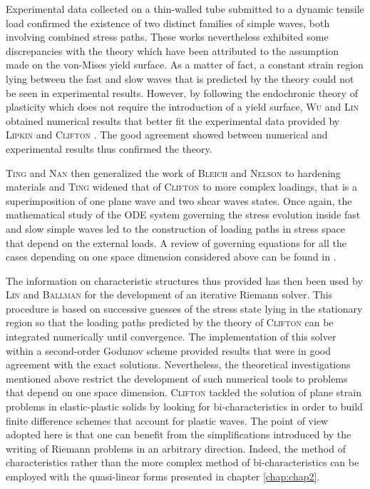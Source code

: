 Experimental data collected on a thin-walled tube submitted to a dynamic tensile load \cite{Clifton_exp,Clifton_exp2} confirmed the existence of two distinct families of  simple waves, both involving combined stress paths.
These works nevertheless exhibited some discrepancies with the theory which have been attributed to the assumption made on the von-Mises yield surface.
As a matter of fact, a constant strain region lying between the fast and slow waves that is predicted by the theory \cite{Clifton} could not be seen in experimental results.
However, by following the endochronic theory of plasticity \cite{Valanis} which does not require the introduction of a yield surface, \textsc{Wu} and \textsc{Lin} \cite{Wu_experimental} obtained numerical results that better fit the experimental data provided by \textsc{Lipkin} and \textsc{Clifton} \cite{Clifton_exp2}.
The good agreement showed between numerical and experimental results \cite{Wu_experimental} thus confirmed the theory.

\textsc{Ting} and \textsc{Nan} \cite{Ting68} then generalized the work of \textsc{Bleich} and \textsc{Nelson} to hardening materials and \textsc{Ting} \cite{Ting69} widened that of \textsc{Clifton} to more complex loadings, that is a superimposition of one plane wave and two shear waves states.
Once again, the mathematical study of the ODE system governing the stress evolution inside fast and slow simple waves led to the construction of loading paths in stress space that depend on the external loads. A review of governing equations for all the cases depending on one space dimension considered above can be found in \cite{Nowacki}.

The information on characteristic structures thus provided has then been used by \textsc{Lin} and \textsc{Ballman} \cite{Lin_et_Ballman} for the development of an iterative Riemann solver.
This procedure is based on successive guesses of the stress state lying in the stationary region so that the loading paths predicted by the theory of \textsc{Clifton} \cite{Clifton} can be integrated numerically until convergence.
The implementation of this solver within a second-order Godunov scheme provided results that were in good agreement with the exact solutions.
Nevertheless, the theoretical investigations mentioned above restrict the development of such numerical tools to problems that depend on one space dimension.
\textsc{Clifton} tackled the solution of plane strain problems in elastic-plastic solids by looking for bi-characteristics \cite{Clifton_thesis} in order to build finite difference schemes that account for plastic waves.
The point of view adopted here is that one can benefit from the simplifications introduced by the writing of Riemann problems in an arbitrary direction.
Indeed, the method of characteristics rather than the more complex method of bi-characteristics can be employed with the quasi-linear forms presented in chapter \ref{chap:chap2}.

